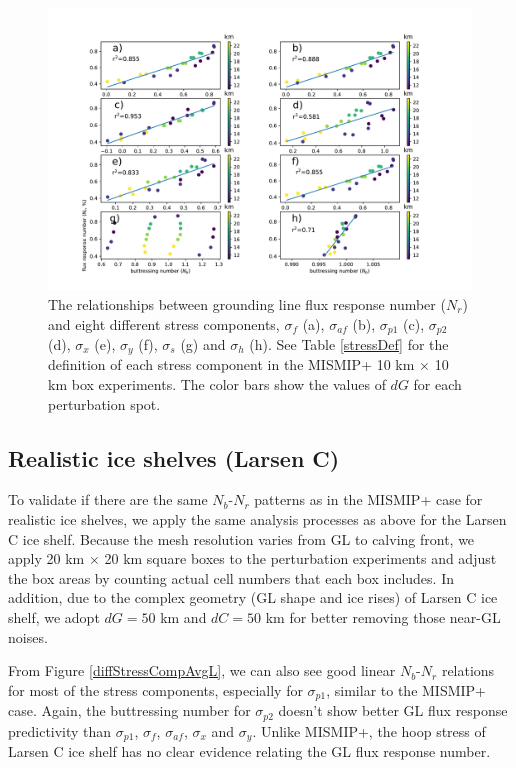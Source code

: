 \documentclass[review,oneside]{igs}
\begin{document}
\begin{figure}
\centering
\includegraphics[width=1\linewidth]{figs/diffStressCompAvg.pdf}
\caption{The relationships between grounding line flux response number ($N_r$) and eight different stress components, $\sigma_f$ (a), $\sigma_{af}$ (b), $\sigma_{p1}$ (c), $\sigma_{p2}$ (d), $\sigma_{x}$ (e), $\sigma_{y}$ (f), $\sigma_{s}$ (g) and $\sigma_h$ (h). See Table \ref{stressDef} for the definition of each stress component in the MISMIP+ 10 km $\times$ 10 km box experiments. The color bars show the values of $dG$ for each perturbation spot.}
\label{diffStressCompAvg}
\end{figure}

\subsection{Realistic ice shelves (Larsen C)}

To validate if there are the same $N_b$-$N_r$ patterns as in the MISMIP+ case for realistic ice shelves, we apply the same analysis processes as above for the Larsen C ice shelf. Because the mesh resolution varies from GL to calving front, we apply 20 km $\times$ 20 km square boxes to the perturbation experiments and adjust the box areas by counting actual cell numbers that each box includes. In addition, due to the complex geometry (GL shape and ice rises) of Larsen C ice shelf, we adopt $dG=50$ km and $dC = 50$ km for better removing those near-GL noises. 

From Figure \ref{diffStressCompAvgL}, we can also see good linear $N_b$-$N_r$ relations for most of the stress components, especially for $\sigma_{p1}$, similar to the MISMIP+ case. Again, the buttressing number for $\sigma_{p2}$ doesn't show better GL flux response predictivity than $\sigma_{p1}$, $\sigma_{f}$, $\sigma_{af}$, $\sigma_{x}$ and $\sigma_{y}$. Unlike MISMIP+, the hoop stress of Larsen C ice shelf has no clear evidence relating the GL flux response number.
\end{document}
